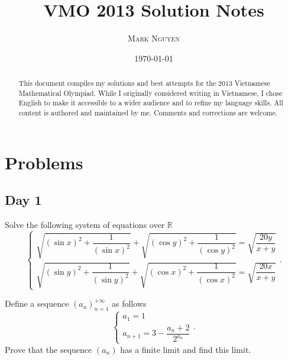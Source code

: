 \documentclass[11pt]{article}
\title{\textbf{\Huge VMO 2013 Solution Notes}}
\author{\LARGE \textsc{Mark Nguyen}}
\date{\sffamily\today}
\begin{document}
\maketitle

\begin{abstract}
    This document compiles my solutions and best attempts for the 2013 Vietnamese Mathematical Olympiad. While I originally considered writing in Vietnamese, I chose English to make it accessible to a wider audience and to refine my language skills. All content is authored and maintained by me. Comments and corrections are welcome.
\end{abstract}

\tableofcontents

\newpage

\section{Problems}

    \subsection*{Day 1}

        \begin{exercise}
            Solve the following system of equations over \(\mathbb{R}\)
            \[\begin{cases}
                \sqrt{\left(\sin x\right)^2 + \dfrac{1}{\left(\sin x\right)^2}} + \sqrt{\left(\cos y\right)^2 + \dfrac{1}{\left(\cos y\right)^2}} = \sqrt{\dfrac{20y}{x + y}} \\
                \sqrt{\left(\sin y\right)^2 + \dfrac{1}{\left(\sin y\right)^2}} + \sqrt{\left(\cos x\right)^2 + \dfrac{1}{\left(\cos x\right)^2}} = \sqrt{\dfrac{20x}{x + y}}
            \end{cases}.\]
        \end{exercise}
    
        \boom
    
        \begin{exercise}
            Define a sequence \((a_n)_{n=1}^{+\infty}\) as follows
            \[\begin{cases}
                a_1 = 1 \\
                a_{n+1} = 3 - \dfrac{a_n + 2}{2^{a_n}} 
            \end{cases}.\]
            Prove that the sequence \((a_n)\) has a finite limit and find this limit.
        \end{exercise}
    
\end{document}
